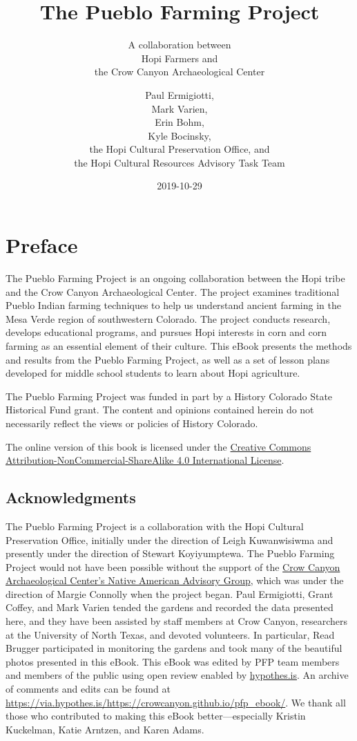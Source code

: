 \documentclass[12pt,]{article}
\title{The Pueblo Farming Project}
\subtitle{A collaboration between\\
Hopi Farmers and\\
the Crow Canyon Archaeological Center}
\author{Paul Ermigiotti,\\
Mark Varien,\\
Erin Bohm,\\
Kyle Bocinsky,\\
the Hopi Cultural Preservation Office, and\\
the Hopi Cultural Resources Advisory Task Team}
\date{2019-10-29}
\begin{document}
\maketitle

{
\hypersetup{linkcolor=black}
\setcounter{tocdepth}{2}
\tableofcontents
}
\listoftables
\listoffigures
\hypertarget{preface}{%
\section*{Preface}\label{preface}}

The Pueblo Farming Project is an ongoing collaboration between the Hopi tribe and the Crow Canyon Archaeological Center. The project examines traditional Pueblo Indian farming techniques to help us understand ancient farming in the Mesa Verde region of southwestern Colorado. The project conducts research, develops educational programs, and pursues Hopi interests in corn and corn farming as an essential element of their culture. This eBook presents the methods and results from the Pueblo Farming Project, as well as a set of lesson plans developed for middle school students to learn about Hopi agriculture.

The Pueblo Farming Project was funded in part by a History Colorado State Historical Fund grant. The content and opinions contained herein do not necessarily reflect the views or policies of History Colorado.

The online version of this book is licensed under the \href{http://creativecommons.org/licenses/by-nc-sa/4.0/}{Creative Commons Attribution-NonCommercial-ShareAlike 4.0 International License}.

\hypertarget{acknowledgments}{%
\subsection*{Acknowledgments}\label{acknowledgments}}

The Pueblo Farming Project is a collaboration with the Hopi Cultural Preservation Office, initially under the direction of Leigh Kuwanwisiwma and presently under the direction of Stewart Koyiyumptewa. The Pueblo Farming Project would not have been possible without the support of the \href{https://www.crowcanyon.org/index.php/native-american-advisory-group}{Crow Canyon Archaeological Center's Native American Advisory Group}, which was under the direction of Margie Connolly when the project began. Paul Ermigiotti, Grant Coffey, and Mark Varien tended the gardens and recorded the data presented here, and they have been assisted by staff members at Crow Canyon, researchers at the University of North Texas, and devoted volunteers. In particular, Read Brugger participated in monitoring the gardens and took many of the beautiful photos presented in this eBook. This eBook was edited by PFP team members and members of the public using open review enabled by \href{https://hypothes.is/}{hypothes.is}. An archive of comments and edits can be found at \url{https://via.hypothes.is/https://crowcanyon.github.io/pfp_ebook/}. We thank all those who contributed to making this eBook better---especially Kristin Kuckelman, Katie Arntzen, and Karen Adams.
\end{document}
